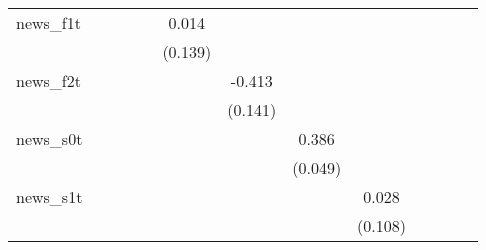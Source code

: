 {\begin{tabular}{l*{12}{c}}
\addlinespace
news\_f1t    &                     &                     &                     &                     &       0.014         &                     &                     &                     &                     &                     &                     &                     \\
            &                     &                     &                     &                     &     (0.139)         &                     &                     &                     &                     &                     &                     &                     \\
\addlinespace
news\_f2t    &                     &                     &                     &                     &                     &      -0.413\sym{***}&                     &                     &                     &                     &                     &                     \\
            &                     &                     &                     &                     &                     &     (0.141)         &                     &                     &                     &                     &                     &                     \\
\addlinespace
news\_s0t    &                     &                     &                     &                     &                     &                     &       0.386\sym{***}&                     &                     &                     &                     &                     \\
            &                     &                     &                     &                     &                     &                     &     (0.049)         &                     &                     &                     &                     &                     \\
\addlinespace
news\_s1t    &                     &                     &                     &                     &                     &                     &                     &       0.028         &                     &                     &                     &                     \\
            &                     &                     &                     &                     &                     &                     &                     &     (0.108)         &                     &                     &                     &                     \\

\end{tabular}}
